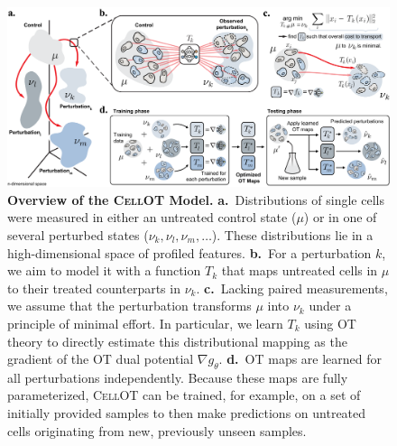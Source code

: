 \begin{figure}[t]
    \centering
    \includegraphics[width=\textwidth]{figures/fig_overview_cellot.pdf}
    \caption{\textbf{Overview of the \textsc{CellOT} Model.} \textbf{a.}~Distributions of single cells were measured in either an untreated control state ($\mu$) or in one of several perturbed states ($\nu_k, \nu_l, \nu_m,  \ldots$). These distributions lie in a high-dimensional space of profiled features. \textbf{b.}~For a perturbation $k$, we aim to model it with a function $T_k$ that maps untreated cells in $\mu$ to their treated counterparts in $\nu_k$. \textbf{c.}~Lacking paired measurements, we assume that the perturbation transforms $\mu$ into $\nu_k$ under a principle of minimal effort. In particular, we learn $T_k$ using \acrlong{OT} theory to directly estimate this distributional mapping as the gradient of the \acrlong{OT} dual potential $\nabla g_\theta$.
    \textbf{d.}~OT maps are learned for all perturbations independently. Because these maps are fully parameterized, \textsc{CellOT} can be trained, for example, on a set of initially provided samples to then make predictions on untreated cells originating from new, previously unseen samples.}
    \label{fig:overview_cellot}
\end{figure}


